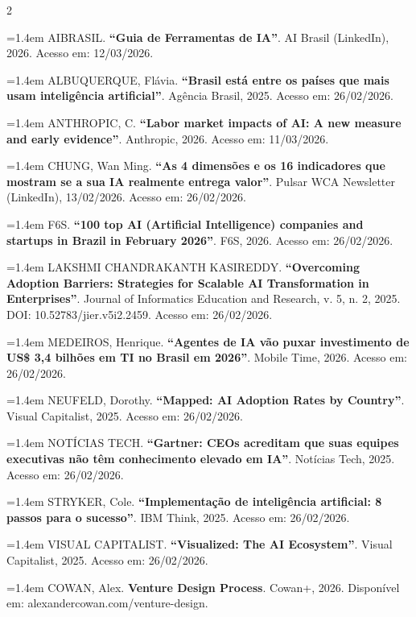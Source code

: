 \documentclass[10pt]{article}
\newcommand{\cols}{\begin{multicols}{2}}
\newcommand{\ecols}{\end{multicols}}
\begin{document}
\clearpage
\vspace{6pt}
\par
\vspace{2pt}{\color{line}\rule{\linewidth}{0.8pt}}\par\vspace{6pt}

{\footnotesize\setlength{\parindent}{0pt}%
\newcommand{\rref}[1]{\par\hangindent=1.4em #1\par\vspace{4pt}}
\cols
\rref{AIBRASIL. \textbf{``Guia de Ferramentas de IA''}. AI Brasil (LinkedIn), 2026. Acesso em: 12/03/2026.}
\rref{ALBUQUERQUE, Flávia. \textbf{``Brasil está entre os países que mais usam inteligência artificial''}. Agência Brasil, 2025. Acesso em: 26/02/2026.}
\rref{ANTHROPIC, C. \textbf{``Labor market impacts of AI: A new measure and early evidence''}. Anthropic, 2026. Acesso em: 11/03/2026.}
\rref{CHUNG, Wan Ming. \textbf{``As 4 dimensões e os 16 indicadores que mostram se a sua IA realmente entrega valor''}. Pulsar WCA Newsletter (LinkedIn), 13/02/2026. Acesso em: 26/02/2026.}
\rref{F6S. \textbf{``100 top AI (Artificial Intelligence) companies and startups in Brazil in February 2026''}. F6S, 2026. Acesso em: 26/02/2026.}
\rref{LAKSHMI CHANDRAKANTH KASIREDDY. \textbf{``Overcoming Adoption Barriers: Strategies for Scalable AI Transformation in Enterprises''}. Journal of Informatics Education and Research, v. 5, n. 2, 2025. DOI: 10.52783/jier.v5i2.2459. Acesso em: 26/02/2026.}
\rref{MEDEIROS, Henrique. \textbf{``Agentes de IA vão puxar investimento de US\$ 3,4 bilhões em TI no Brasil em 2026''}. Mobile Time, 2026. Acesso em: 26/02/2026.}
\rref{NEUFELD, Dorothy. \textbf{``Mapped: AI Adoption Rates by Country''}. Visual Capitalist, 2025. Acesso em: 26/02/2026.}
\rref{NOTÍCIAS TECH. \textbf{``Gartner: CEOs acreditam que suas equipes executivas não têm conhecimento elevado em IA''}. Notícias Tech, 2025. Acesso em: 26/02/2026.}
\rref{STRYKER, Cole. \textbf{``Implementação de inteligência artificial: 8 passos para o sucesso''}. IBM Think, 2025. Acesso em: 26/02/2026.}
\rref{VISUAL CAPITALIST. \textbf{``Visualized: The AI Ecosystem''}. Visual Capitalist, 2025. Acesso em: 26/02/2026.}
\rref{COWAN, Alex. \textbf{Venture Design Process}. Cowan+, 2026. Disponível em: alexandercowan.com/venture-design.}
\ecols
}
\end{document}
